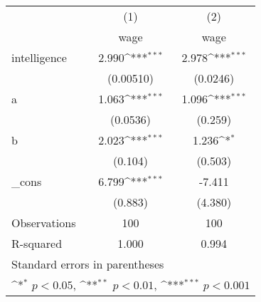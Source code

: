 {
\def\sym#1{\ifmmode^{#1}\else\(^{#1}\)\fi}
\begin{tabular}{l*{2}{c}}
\hline\hline
            &\multicolumn{1}{c}{(1)}&\multicolumn{1}{c}{(2)}\\
            &\multicolumn{1}{c}{wage}&\multicolumn{1}{c}{wage}\\
\hline
intelligence&       2.990\sym{***}&       2.978\sym{***}\\
            &   (0.00510)         &    (0.0246)         \\
[1em]
a           &       1.063\sym{***}&       1.096\sym{***}\\
            &    (0.0536)         &     (0.259)         \\
[1em]
b           &       2.023\sym{***}&       1.236\sym{*}  \\
            &     (0.104)         &     (0.503)         \\
[1em]
\_cons      &       6.799\sym{***}&      -7.411         \\
            &     (0.883)         &     (4.380)         \\
\hline
Observations&         100         &         100         \\
R-squared   &       1.000         &       0.994         \\
\hline\hline
\multicolumn{3}{l}{\footnotesize Standard errors in parentheses}\\
\multicolumn{3}{l}{\footnotesize \sym{*} \(p<0.05\), \sym{**} \(p<0.01\), \sym{***} \(p<0.001\)}\\
\end{tabular}
}
